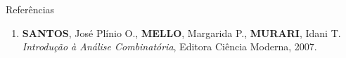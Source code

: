 \begin{frame}[fragile]{Referências}

    \begin{enumerate}
        \item \textbf{SANTOS}, José Plínio O., \textbf{MELLO}, Margarida P., \textbf{MURARI}, 
            Idani T. \textit{Introdução à Análise Combinatória}, Editora Ciência Moderna, 2007.
    \end{enumerate}

\end{frame}
